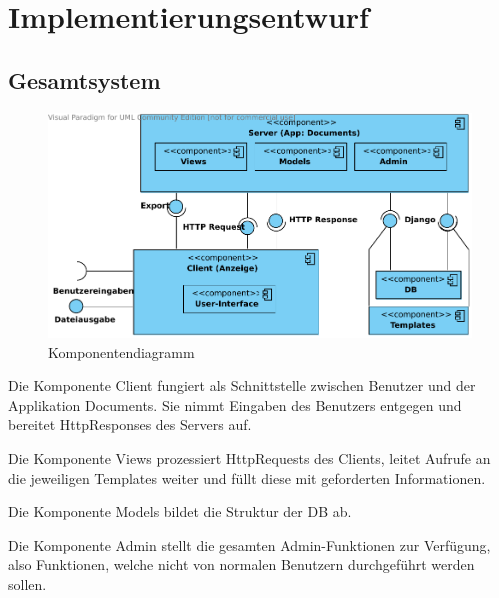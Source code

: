 \chapter{Implementierungsentwurf}


\section{Gesamtsystem}
\begin{figure}[!htb]
\includegraphics[width=0.8\linewidth]{bilder/Komponentendiagramm.pdf}
\caption{Komponentendiagramm}
\label{fig:KompDiagramm}
\end{figure}

Die Komponente Client fungiert als Schnittstelle zwischen Benutzer und der 
Applikation Documents. Sie nimmt Eingaben des Benutzers entgegen und bereitet 
HttpResponses des Servers auf.

Die Komponente Views prozessiert HttpRequests des Clients, leitet Aufrufe an die
jeweiligen Templates weiter und füllt diese mit geforderten Informationen.

Die Komponente Models bildet die Struktur der DB ab.

Die Komponente Admin stellt die gesamten Admin-Funktionen zur Verfügung, also 
Funktionen, welche nicht von normalen Benutzern durchgeführt werden sollen.

